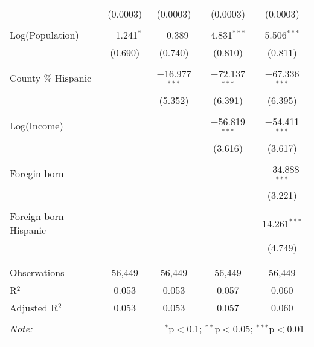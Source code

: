 \begin{table}[!htbp]
\begin{tabular}{@{\extracolsep{-5pt}}lcccc}
  & (0.0003) & (0.0003) & (0.0003) & (0.0003) \\ 
  & & & & \\ 
 Log(Population) & $-$1.241$^{*}$ & $-$0.389 & 4.831$^{***}$ & 5.506$^{***}$ \\ 
  & (0.690) & (0.740) & (0.810) & (0.811) \\ 
  & & & & \\ 
 County \% Hispanic &  & $-$16.977$^{***}$ & $-$72.137$^{***}$ & $-$67.336$^{***}$ \\ 
  &  & (5.352) & (6.391) & (6.395) \\ 
  & & & & \\ 
 Log(Income) &  &  & $-$56.819$^{***}$ & $-$54.411$^{***}$ \\ 
  &  &  & (3.616) & (3.617) \\ 
  & & & & \\ 
 Foregin-born &  &  &  & $-$34.888$^{***}$ \\ 
  &  &  &  & (3.221) \\ 
  & & & & \\ 
 Foreign-born Hispanic &  &  &  & 14.261$^{***}$ \\ 
  &  &  &  & (4.749) \\ 
  & & & & \\ 
\hline \\[-1.8ex] 
Observations & 56,449 & 56,449 & 56,449 & 56,449 \\ 
R$^{2}$ & 0.053 & 0.053 & 0.057 & 0.060 \\ 
Adjusted R$^{2}$ & 0.053 & 0.053 & 0.057 & 0.060 \\ 
\hline 
\hline \\[-1.8ex] 
\textit{Note:}  & \multicolumn{4}{r}{$^{*}$p$<$0.1; $^{**}$p$<$0.05; $^{***}$p$<$0.01} \\ 
 & \multicolumn{4}{r}{} \\ 
\end{tabular} 
\end{table} 
